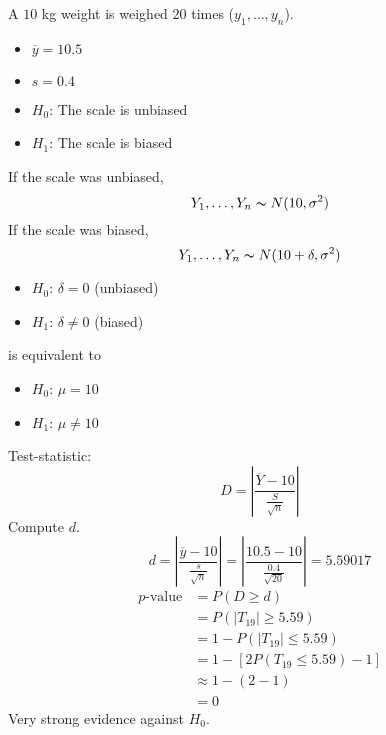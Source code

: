 \begin{exbox}
    \begin{example}[Bias]
        A $ 10 $ kg weight is weighed $ 20 $ times ($ y_1,\ldots ,y_n $).
        \begin{itemize}
            \item $ \overline{y}=10.5 $
            \item $ s=0.4 $
            \item $ H_0 $: The scale is unbiased
            \item $ H_1 $: The scale is biased
        \end{itemize}
        If the scale was unbiased,
        \[ Y_1,\ldots ,Y_n \thicksim N(10,\sigma^2) \]
        If the scale was biased,
        \[ Y_1,\ldots ,Y_n \thicksim N(10+\delta,\sigma^2) \]
        \begin{itemize}
            \item $ H_0 $: $ \delta=0 $ (unbiased)
            \item $ H_1 $: $ \delta\neq 0 $ (biased)
        \end{itemize}
        is equivalent to
        \begin{itemize}
            \item $ H_0 $: $ \mu=10 $
            \item $ H_1 $: $ \mu\neq 10 $
        \end{itemize}
        Test-statistic:
        \[ D=\left|\frac{\overline{Y}-10}{\frac{S}{\sqrt{n}}} \right| \]
        Compute $ d $.
        \[ d=
            \left|\frac{\overline{y}-10}{\frac{s}{\sqrt{n}}} \right|=
            \left|\frac{10.5-10}{\frac{0.4}{\sqrt{20}}} \right|=5.59017 \]
        \[
            \begin{aligned}
                p\text{-value}
                 & =P(D\geqslant d)                             \\
                 & =P(|T_{19}|\geqslant 5.59)                   \\
                 & = 1-P(|T_{19}|\leqslant 5.59)                \\
                 & =1-\left[ 2P(T_{19}\leqslant 5.59)-1 \right] \\
                 & \approx 1-(2-1)                              \\
                 & =0
            \end{aligned}
        \]
        Very strong evidence against $ H_0 $.
    \end{example}
\end{exbox}

